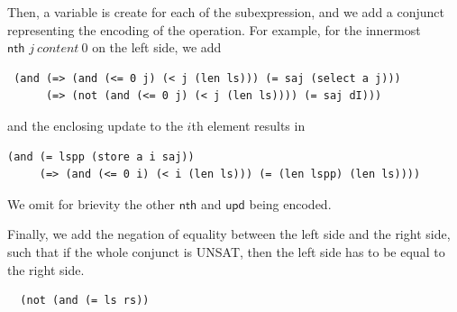 \documentclass[onecolumn, preprint]{sigplanconf}
\newcommand{\nth}[3]{\textsf{nth } #1\ #2\ #3}
\begin{document}
Then, a variable is create for each of the subexpression, and we add a conjunct representing the encoding of the operation. For example, for the innermost $\nth{j}{content}{0}$ on the left side, we add

\begin{lstlisting}
 (and (=> (and (<= 0 j) (< j (len ls))) (= saj (select a j)))
      (=> (not (and (<= 0 j) (< j (len ls)))) (= saj dI)))
\end{lstlisting}

and the enclosing update to the $i$th element results in

\begin{lstlisting}
(and (= lspp (store a i saj))
     (=> (and (<= 0 i) (< i (len ls))) (= (len lspp) (len ls))))
\end{lstlisting}

We omit for brievity the other $\textsf{nth}$ and $\textsf{upd}$ being encoded.

Finally, we add the negation of equality between the left side and the right side, such that if the whole conjunct is UNSAT, then the left side has to be equal to the right side.

\begin{lstlisting}
  (not (and (= ls rs))
  \end{lstlisting}

\end{document}
